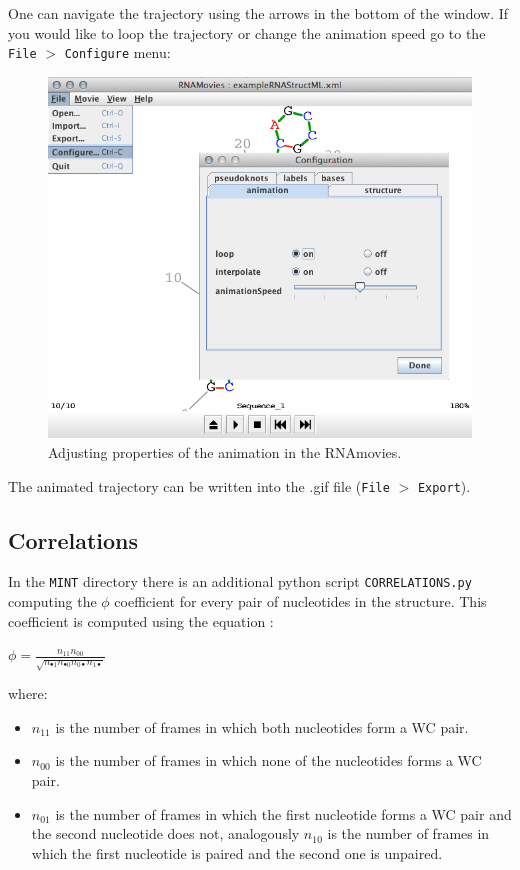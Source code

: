 \documentclass[12pt]{article}
\begin{document}
One can navigate the trajectory using the arrows in the bottom of the window. If you would like to loop the trajectory or change the animation speed go to the {\tt File} $>$ {\tt Configure} menu: 
\begin{figure}[h!]
\centering
\includegraphics[scale=0.4]{./pictures/RNAmovies_3.png}
\caption{Adjusting properties of the animation in the RNAmovies.}
\end{figure}

The animated trajectory can be written into the .gif file  ({\tt File} $>$ {\tt Export}).
\newpage
\subsection{Correlations}\label{CorrelationsParagraph}
In the {\tt MINT} directory there is an additional python script {\tt CORRELATIONS.py} computing the $\phi$ coefficient for every pair of nucleotides in the structure. This coefficient is computed using the equation \cite{Everitt1977}:
\begin{center}
\begin{large}
$ \phi = \frac{n_{11}n_{00}}{\sqrt{n_{\bullet1}n_{\bullet0} n_{0\bullet}n_{1\bullet}}}$
\end{large}
\end{center}

where:
\begin{itemize}
\item $n_{11}$ is the number of frames in which both nucleotides form a WC pair.
\item $n_{00}$ is the number of frames in which none of the nucleotides forms a WC pair.
\item $n_{01}$ is the number of frames in which the first nucleotide forms a WC pair and the second nucleotide does not, analogously $n_{10}$ is the number of frames in which the first nucleotide is paired and the second one is unpaired.
\end{itemize}
\end{document}
